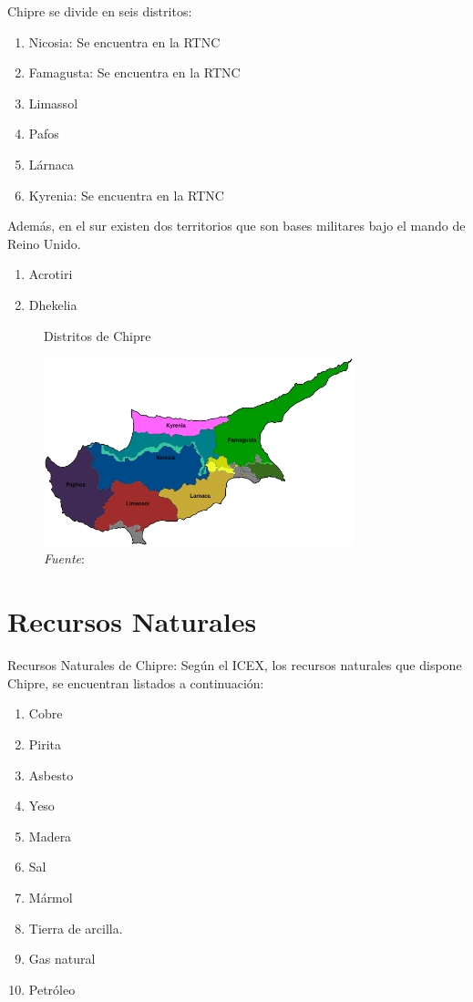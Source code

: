 \documentclass[a4paper,openright,12pt]{book}
\begin{document}
Chipre se divide en seis distritos:

\begin{enumerate}
    \item Nicosia: Se encuentra en la RTNC
    \item Famagusta: Se encuentra en la RTNC
    \item Limassol
    \item Pafos
    \item Lárnaca
    \item Kyrenia: Se encuentra en la RTNC
\end{enumerate}

 Además, en el sur existen dos territorios que son bases militares bajo el mando de Reino Unido.

\begin{enumerate}
    \item Acrotiri
    \item Dhekelia
\end{enumerate}

\begin{figure}[ht]
    \centering
    \caption{Distritos de Chipre}
    \includegraphics[width=9cm]{mapa_distritos.png}
    \caption*{\textit{Fuente}: \cite{ChipreWi33}}
    \label{mapdistrics}
\end{figure}


\section{Recursos Naturales}

Recursos Naturales de Chipre:
Según el ICEX, los recursos naturales que dispone Chipre, se encuentran listados a continuación:

\begin{enumerate}
    \item Cobre
    \item Pirita
    \item Asbesto
    \item Yeso
    \item Madera
    \item Sal
    \item Mármol
    \item Tierra de arcilla.
    \item Gas natural
    \item Petróleo
\end{enumerate}
\end{document}
